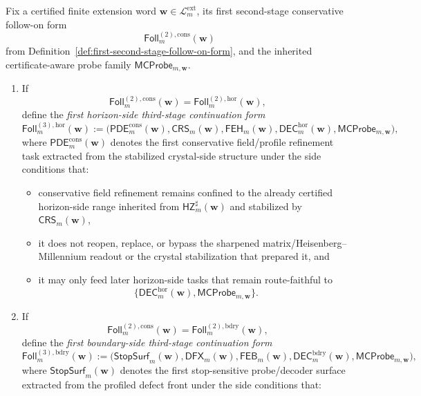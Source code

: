 \begin{definition}
\label{def:first-third-stage-continuation-form}
Fix a certified finite extension word \(\mathbf w\in\mathcal L^{\mathrm{ext}}_{m}\), its first second-stage conservative follow-on form
\[
 \mathsf{Foll}^{(2),\mathrm{cons}}_{m}(\mathbf w)
\]
from Definition~\ref{def:first-second-stage-follow-on-form}, and the inherited certificate-aware probe family \(\mathsf{MCProbe}_{m,\mathbf w}\).
\begin{enumerate}[label=(\roman*)]
 \item If
 \[
 \mathsf{Foll}^{(2),\mathrm{cons}}_{m}(\mathbf w)=\mathsf{Foll}^{(2),\mathrm{hor}}_{m}(\mathbf w),
 \]
 define the \emph{first horizon-side third-stage continuation form}
 \[
 \mathsf{Foll}^{(3),\mathrm{hor}}_{m}(\mathbf w)
 :=
 \bigl(\mathsf{PDE}^{\mathrm{cons}}_{m}(\mathbf w),\mathsf{CRS}_{m}(\mathbf w),\mathsf{FEH}_{m}(\mathbf w),\mathsf{DEC}^{\mathrm{hor}}_{m}(\mathbf w),\mathsf{MCProbe}_{m,\mathbf w}\bigr),
 \]
 where \(\mathsf{PDE}^{\mathrm{cons}}_{m}(\mathbf w)\) denotes the first conservative field/profile refinement task extracted from the stabilized crystal-side structure under the side conditions that:
 \begin{itemize}[leftmargin=2em]
 \item conservative field refinement remains confined to the already certified horizon-side range inherited from \(\mathsf{HZ}^{\sharp}_{m}(\mathbf w)\) and stabilized by \(\mathsf{CRS}_{m}(\mathbf w)\),
 \item it does not reopen, replace, or bypass the sharpened matrix/Heisenberg--Millennium readout or the crystal stabilization that prepared it, and
 \item it may only feed later horizon-side tasks that remain route-faithful to
 \[
 \{\mathsf{DEC}^{\mathrm{hor}}_{m}(\mathbf w),\mathsf{MCProbe}_{m,\mathbf w}\}.
 \]
 \end{itemize}
 \item If
 \[
 \mathsf{Foll}^{(2),\mathrm{cons}}_{m}(\mathbf w)=\mathsf{Foll}^{(2),\mathrm{bdry}}_{m}(\mathbf w),
 \]
 define the \emph{first boundary-side third-stage continuation form}
 \[
 \mathsf{Foll}^{(3),\mathrm{bdry}}_{m}(\mathbf w)
 :=
 \bigl(\mathsf{StopSurf}_{m}(\mathbf w),\mathsf{DFX}_{m}(\mathbf w),\mathsf{FEB}_{m}(\mathbf w),\mathsf{DEC}^{\mathrm{bdry}}_{m}(\mathbf w),\mathsf{MCProbe}_{m,\mathbf w}\bigr),
 \]
 where \(\mathsf{StopSurf}_{m}(\mathbf w)\) denotes the first stop-sensitive probe/decoder surface extracted from the profiled defect front under the side conditions that:

\end{enumerate}
\end{definition}
